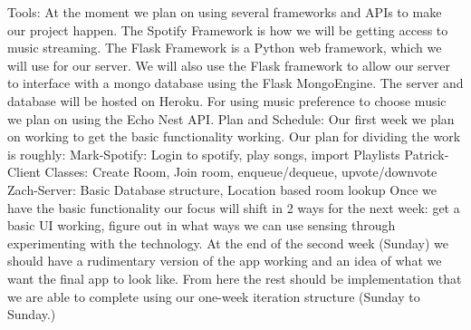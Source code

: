 \documentclass[12pt]{article}
\begin{document}
\begin{enumerate}
Tools: At the moment we plan on using several frameworks and APIs to make our project happen. The Spotify Framework is how we will be getting access to music streaming. The Flask Framework is a Python web framework, which we will use for our server. We will also use the Flask framework to allow our server to interface with a mongo database using the Flask MongoEngine. The server and database will be hosted on Heroku. For using music preference to choose music we plan on using the Echo Nest API.
\newline \newline
Plan and Schedule:  Our first week we plan on working to get the basic functionality working. Our plan for dividing the work is roughly:
Mark-Spotify: Login to spotify, play songs, import Playlists
Patrick-Client Classes: Create Room, Join room, enqueue/dequeue, upvote/downvote
Zach-Server: Basic Database structure,  Location based room lookup 
\newline \newline
Once we have the basic functionality our focus will shift in 2 ways for the next week: get a basic UI working, figure out in what ways we can use sensing through experimenting with the technology.
\newline \newline
At the end of the second week (Sunday) we should have a rudimentary version of the app working and an idea of what we want the final app to look like. From here the rest should be implementation that we are able to complete using our one-week iteration structure (Sunday to Sunday.)

\end{enumerate}
\end{document}
